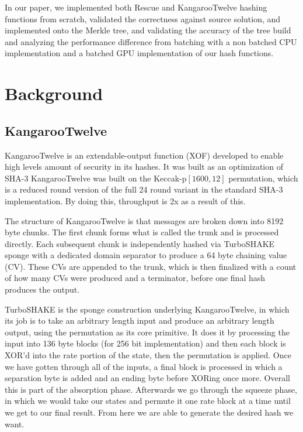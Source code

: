 \documentclass[conference]{IEEEtran}
\begin{document}
In our paper, we implemented both Rescue and KangarooTwelve hashing functions from scratch, validated the correctness against source solution, and implemented onto the Merkle tree, and validating the accuracy of the tree build and analyzing the performance difference from batching with a non batched CPU implementation and a batched GPU implementation of our hash functions.

\section{Background}

\subsection{KangarooTwelve}

KangarooTwelve is an extendable-output function (XOF) developed to enable high levels amount of security in its hashes. It was built as an optimization of SHA-3 KangarooTwelve was built on the Keccak-p$[1600, 12]$ permutation, which is a reduced round version of the full 24 round variant in the standard SHA-3 implementation. By doing this, throughput is 2x as a result of this. 

The structure of KangarooTwelve is that messages are broken down into 8192 byte chunks. The first chunk forms what is called the trunk and is processed directly. Each subsequent chunk is independently hashed via TurboSHAKE sponge with a dedicated domain separator to produce a 64 byte chaining value (CV). These CVs are appended to the trunk, which is then finalized with a count of how many CVs were produced and a terminator, before one final hash produces the output.

TurboSHAKE is the sponge construction underlying KangarooTwelve, in which its job is to take an arbitrary length input and produce an arbitrary length output, using the permutation as its core primitive. It does it by processing the input into 136 byte blocks (for 256 bit implementation) and then each block is XOR'd into the rate portion of the state, then the permutation is applied. Once we have gotten through all of the inputs, a final block is processed in which a separation byte is added and an ending byte before XORing once more. Overall this is part of the absorption phase. Afterwards we go through the squeeze phase, in which we would take our states and permute it one rate block at a time until we get to our final result. From here we are able to generate the desired hash we want.
\end{document}
